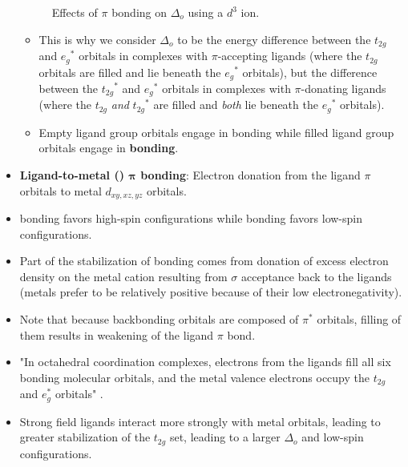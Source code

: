 \documentclass[../notes.tex]{subfiles}
\begin{document}
\begin{itemize}
\begin{figure}[h!]
        \caption{Effects of $\pi$ bonding on $\Delta_o$ using a $d^3$ ion.}
        \label{fig:piDeltao}
    \end{figure}
    \begin{itemize}
        \item This is why we consider $\Delta_o$ to be the energy difference between the $t_{2g}$ and ${e_g}^*$ orbitals in complexes with $\pi$-accepting ligands (where the $t_{2g}$ orbitals are filled and lie beneath the ${e_g}^*$ orbitals), but the difference between the ${t_{2g}}^*$ and ${e_g}^*$ orbitals in complexes with $\pi$-donating ligands (where the $t_{2g}$ \emph{and} ${t_{2g}}^*$ are filled and \emph{both} lie beneath the ${e_g}^*$ orbitals).
        \item Empty ligand group orbitals engage in  bonding while filled ligand group orbitals engage in \textbf{ bonding}.
    \end{itemize}
    \item \textbf{Ligand-to-metal () $\bm{\pi}$ bonding}: Electron donation from the ligand $\pi$ orbitals to metal $d_{xy,xz,yz}$ orbitals.
    \item {} bonding favors high-spin configurations while  bonding favors low-spin configurations.
    \item Part of the stabilization of  bonding comes from donation of excess electron density on the metal cation resulting from $\sigma$ acceptance back to the ligands (metals prefer to be relatively positive because of their low electronegativity).
    \item Note that because backbonding orbitals are composed of $\pi^*$ orbitals, filling of them results in weakening of the ligand $\pi$ bond.
    \item "In octahedral coordination complexes, electrons from the ligands fill all six bonding molecular orbitals, and the metal valence electrons occupy the $t_{2g}$ and $e_g^*$ orbitals" \parencite[372]{bib:MiesslerFischerTarr}.
    \item Strong field ligands interact more strongly with metal orbitals, leading to greater stabilization of the $t_{2g}$ set, leading to a larger $\Delta_o$ and low-spin configurations.

\end{itemize}
\end{document}

